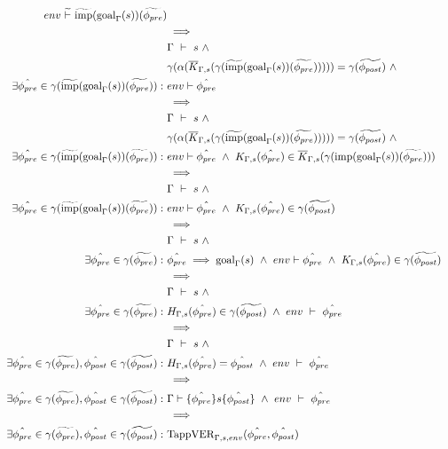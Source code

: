 \documentclass[11pt,a4paper]{article}
\newcommand{\grad}[1]{\widetilde{#1}}
\newcommand{\hoare}[3]{\vdash\{#1\}#2\{#3\}}
\newcommand{\imp}{\textrm{imp}}
\newcommand{\goal}{\ensuremath{\textrm{goal}_{\Gamma}}}
\newcommand{\TappVER}{\ensuremath{\textrm{TappVER}}}
\begin{document}
\begin{description}
\begin{align*}
	env \gdash \grad{\imp}(\goal(s))(\grad{\phi_{pre}})\\
&\implies\\
	&\Gamma ~\vdash~ s ~\wedge~\\
	&\gamma(\alpha(\overline{K}_{\Gamma, s}(\gamma(\grad{\imp}(\goal(s))(\grad{\phi_{pre}}))))) = \gamma(\grad{\phi_{post}}) ~\wedge~\\
	\exists \hat{\phi_{pre}} \in \gamma(\grad{\imp}(\goal(s))(\grad{\phi_{pre}})) : ~
	&env \vdash \hat{\phi_{pre}}\\
&\implies\\
	&\Gamma ~\vdash~ s ~\wedge~\\
	&\gamma(\alpha(\overline{K}_{\Gamma, s}(\gamma(\grad{\imp}(\goal(s))(\grad{\phi_{pre}}))))) = \gamma(\grad{\phi_{post}}) ~\wedge~\\
	\exists \hat{\phi_{pre}} \in \gamma(\grad{\imp}(\goal(s))(\grad{\phi_{pre}})) : ~
	&env \vdash \hat{\phi_{pre}} ~\wedge~
	K_{\Gamma, s}(\hat{\phi_{pre}}) \in \overline{K}_{\Gamma, s}(\gamma(\imp(\goal(s))(\grad{\phi_{pre}}))) \\
&\implies\\
	&\Gamma ~\vdash~ s ~\wedge~\\
	\exists \hat{\phi_{pre}} \in \gamma(\grad{\imp}(\goal(s))(\grad{\phi_{pre}})) : ~
	& env \vdash \hat{\phi_{pre}} ~\wedge~
	K_{\Gamma, s}(\hat{\phi_{pre}}) \in \gamma(\grad{\phi_{post}}) \\
&\implies\\ %
	&\Gamma ~\vdash~ s ~\wedge~\\
	\exists \hat{\phi_{pre}} \in \gamma(\grad{\phi_{pre}}) : ~
	& \hat{\phi_{pre}} \implies \goal(s) ~\wedge~
	env \vdash \hat{\phi_{pre}} ~\wedge~
	K_{\Gamma, s}(\hat{\phi_{pre}}) \in \gamma(\grad{\phi_{post}}) \\
&\implies\\
	&\Gamma ~\vdash~ s ~\wedge~\\
	\exists \hat{\phi_{pre}} \in \gamma(\grad{\phi_{pre}}) : ~
	&H_{\Gamma, s}(\hat{\phi_{pre}}) \in \gamma(\grad{\phi_{post}}) ~\wedge~
	env ~\vdash~ \hat{\phi_{pre}}\\
&\implies\\
	&\Gamma ~\vdash~ s ~\wedge~\\
	\exists \hat{\phi_{pre}} \in \gamma(\grad{\phi_{pre}}), \hat{\phi_{post}} \in \gamma(\grad{\phi_{post}}) : ~
	&H_{\Gamma, s}(\hat{\phi_{pre}}) = \hat{\phi_{post}} ~\wedge~
	env ~\vdash~ \hat{\phi_{pre}}\\
&\implies\\
	\exists \hat{\phi_{pre}} \in \gamma(\grad{\phi_{pre}}), \hat{\phi_{post}} \in \gamma(\grad{\phi_{post}}) : ~
	&\Gamma \hoare {\hat{\phi_{pre}}} {s} {\hat{\phi_{post}}} ~\wedge~
	env ~\vdash~ \hat{\phi_{pre}}\\
&\implies\\
	\exists \hat{\phi_{pre}} \in \gamma(\grad{\phi_{pre}}), \hat{\phi_{post}} \in \gamma(\grad{\phi_{post}}) : ~
	&\TappVER_{\Gamma, s, env}(\hat{\phi_{pre}}, \hat{\phi_{post}})
	\end{align*}
	

\end{description}
\end{document}
